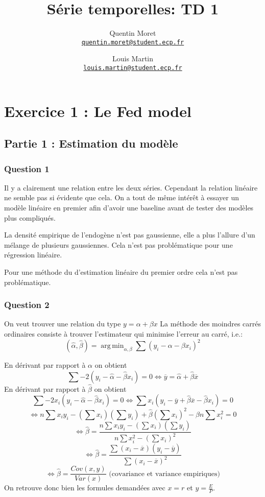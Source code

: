 \documentclass[a4paper,12pt]{article}
\title{Série temporelles: TD 1}
\author{Quentin Moret \\
        \href{mailto:quentin.moret@student.ecp.fr}{\tt quentin.moret@student.ecp.fr}
        \and Louis Martin\\
        \href{mailto:louis.martin@student.ecp.fr}{\tt louis.martin@student.ecp.fr}}
\newcommand{\betahat}{\hat{\beta}}
\newcommand{\alphahat}{\hat{\alpha}}
\newcommand{\ybar}{\overline{y}}
\newcommand{\xbar}{\overline{x}}
\DeclareMathOperator*{\argmin}{arg\,min}
\begin{document}
\maketitle
\section*{Exercice 1 : Le Fed model}
\subsection*{Partie 1 : Estimation du modèle}
\subsubsection*{Question 1}
Il y a clairement une relation entre les deux séries. Cependant la relation linéaire ne semble pas si évidente que cela.
On a tout de même intérêt à essayer un modèle linéaire en premier afin d'avoir une baseline avant de tester des modèles plus compliqués.

La densité empirique de l'endogène n'est pas gaussienne, elle a plus l'allure d'un mélange de plusieurs gaussiennes.
Cela n'est pas problématique pour une régression linéaire.

Pour une méthode du d'estimation linéaire du premier ordre cela n'est pas problématique.
\subsubsection*{Question 2}
On veut trouver une relation du type $y = \alpha + \beta x$
La méthode des moindres carrés ordinaires consiste à trouver l'estimateur qui minimise l'erreur au carré, i.e.:
$$ (\alphahat, \betahat) = \argmin_{\alpha, \beta} \sum (y_i - \alpha - \beta x_i)^2 $$

En dérivant  par rapport à $\alpha$ on obtient
$$ \sum - 2 (y_i - \alphahat - \betahat x_i) = 0 \iff \ybar = \alphahat + \betahat \xbar$$
En dérivant  par rapport à $\betahat$ on obtient
$$ \sum - 2 x_i (y_i - \alphahat - \betahat x_i) = 0 \iff \sum x_i (y_i - \ybar + \betahat \xbar - \betahat x_i) = 0 $$
$$ \iff n \sum x_i y_i - (\sum x_i) (\sum y_i) + \betahat (\sum x_i)^2 - \betahat n \sum x_i^2 = 0 $$
$$ \iff \betahat = \frac{n \sum x_i y_i - (\sum x_i) (\sum y_i)}{n \sum x_i^2 - (\sum x_i)^2 } $$
$$ \iff \betahat = \frac{\sum (x_i - \xbar) (y_i - \ybar)}{\sum (x_i - \xbar)^2 } $$
$$ \iff \betahat = \frac{Cov(x, y)}{Var(x)} \text{ (covariance et variance empiriques)}$$
On retrouve donc bien les formules demandées avec $x = r$ et $y = \frac{E}{P}$.
\end{document}
